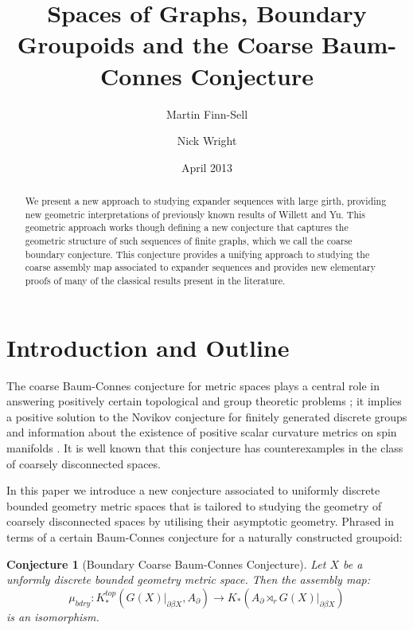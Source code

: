 \documentclass[11pt]{amsart}
\title{Spaces of Graphs, Boundary Groupoids and the Coarse Baum-Connes Conjecture}
\date{April 2013}
\author{Martin Finn-Sell \and Nick Wright}
\theoremstyle{plain}
\newtheorem{conj}{Conjecture}
\theoremstyle{definition}%
\theoremstyle{remark}%
\begin{document}

\begin{abstract}
We present a new approach to studying expander sequences with large girth, providing new geometric interpretations of previously known results of Willett and Yu. This geometric approach works though defining a new conjecture that captures the geometric structure of such sequences of finite graphs, which we call the coarse boundary conjecture. This conjecture provides a unifying approach to studying the coarse assembly map associated to expander sequences and provides new elementary proofs of many of the classical results present in the literature.
\end{abstract}

\maketitle

\section{Introduction and Outline}
The coarse Baum-Connes conjecture for metric spaces plays a central role in answering positively certain topological and group theoretic problems \cite{MR1388312}; it implies a positive solution to the Novikov conjecture for finitely generated discrete groups \cite{MR1779613,MR1388300} and information about the existence of positive scalar curvature metrics on spin manifolds \cite{MR1388300,MR1817560}. It is well known that this conjecture has counterexamples \cite{MR1817560,higsonpreprint,explg1} in the class of coarsely disconnected spaces.

In this paper we introduce a new conjecture associated to uniformly discrete bounded geometry metric spaces that is tailored to studying the geometry of coarsely disconnected spaces by utilising their asymptotic geometry. Phrased in terms of a certain Baum-Connes conjecture for a naturally constructed groupoid:

\begin{conj} [Boundary Coarse Baum-Connes Conjecture]
Let $X$ be a unformly discrete bounded geometry metric space. Then the assembly map:
\begin{equation*}
\mu_{bdry}:K_{*}^{top}(G(X)|_{\partial\beta X}, A_{\partial}) \rightarrow K_{*}(A_{\partial}\rtimes_{r}G(X)|_{\partial\beta X})
\end{equation*}
is an isomorphism.
\end{conj}
\end{document}
